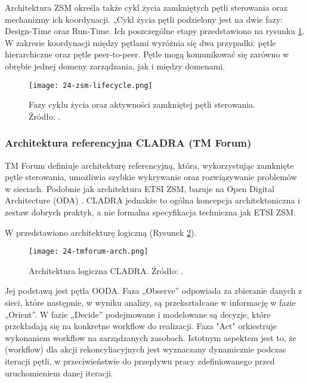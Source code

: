 Architektura ZSM określa także cykl życia zamkniętych pętli sterowania oraz mechanizmy ich koordynacji. „Cykl życia pętli podzielony jest na dwie fazy: Design-Time oraz Run-Time. Ich poszczególne etapy przedstawiono na rysunku \ref{fig:24-zsm-lifecycle}. W zakresie koordynacji między pętlami wyróżnia się dwa przypadki: pętle hierarchiczne oraz pętle peer-to-peer. Pętle mogą komunikować się zarówno w obrębie jednej domeny zarządzania, jak i między domenami.

\begin{figure}[!htbp]
    \centering \texttt{[image: 24-zsm-lifecycle.png]}
    \caption{Fazy cyklu życia oraz aktywności zamkniętej pętli sterowania. Źródło: \cite{etsizsm2019}.}\label{fig:24-zsm-lifecycle}
\end{figure}




\subsubsection{Architektura referencyjna CLADRA (TM Forum)}\hypertarget{sec:cladra}{}

TM Forum definiuje architekturę referencyjną, która, wykorzystując zamknięte pętle sterowania, umożliwia szybkie wykrywanie oraz rozwiązywanie problemów w sieciach. Podobnie jak architektura ETSI ZSM, bazuje na Open Digital Architecture (ODA) \cite{tmforum2018}. CLADRA jednakże to ogólna koncepcja architektoniczna i zestaw dobrych praktyk, a nie formalna specyfikacja techniczna jak ETSI ZSM.

W \cite{tmforum2021} przedstawiono architekturę logiczną (Rysunek \ref{fig:24-tmforum-arch}).

\begin{figure}[!htbp]
    \centering \texttt{[image: 24-tmforum-arch.png]}
    \caption{Architektura logiczna CLADRA. Źródło: \cite{tmforum2021}.}\label{fig:24-tmforum-arch}
\end{figure}

Jej podstawą jest pętla OODA. Faza „Observe” odpowiada za zbieranie danych z sieci, które następnie, w wyniku analizy, są przekształcane w informację w fazie „Orient”. W fazie „Decide” podejmowane i modelowane są decyzje, które przekładają się na konkretne workflow do realizacji. Faza "Act" orkiestruje wykonaniem workflow na zarządzanych zasobach. Istotnym aspektem jest to, że (workflow) dla akcji rekoncyliacyjnych jest wyznaczany dynamicznie podczas iteracji pętli, w przeciwieństwie do przepływu pracy zdefiniowanego przed uruchomieniem danej iteracji. 

